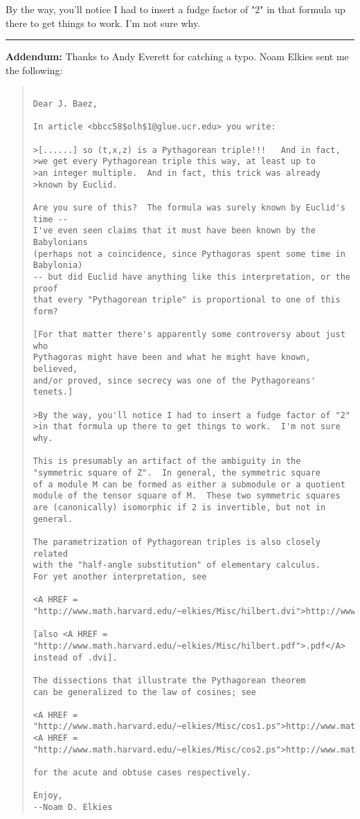By the way, you'll notice I had to insert a fudge factor of
"2" in that formula up there to get things to work.  I'm not
sure why.

\par\noindent\rule{\textwidth}{0.4pt}
\textbf{Addendum:} Thanks to Andy Everett for catching a typo.
Noam Elkies sent me the following:

\begin{quote}

\begin{verbatim}

Dear J. Baez,

In article <bbcc58$olh$1@glue.ucr.edu> you write:

>[......] so (t,x,z) is a Pythagorean triple!!!   And in fact,
>we get every Pythagorean triple this way, at least up to
>an integer multiple.  And in fact, this trick was already
>known by Euclid.

Are you sure of this?  The formula was surely known by Euclid's time --
I've even seen claims that it must have been known by the Babylonians
(perhaps not a coincidence, since Pythagoras spent some time in Babylonia)
-- but did Euclid have anything like this interpretation, or the proof
that every "Pythagorean triple" is proportional to one of this form?

[For that matter there's apparently some controversy about just who
Pythagoras might have been and what he might have known, believed,
and/or proved, since secrecy was one of the Pythagoreans' tenets.]

>By the way, you'll notice I had to insert a fudge factor of "2"
>in that formula up there to get things to work.  I'm not sure why.

This is presumably an artifact of the ambiguity in the
"symmetric square of Z".  In general, the symmetric square
of a module M can be formed as either a submodule or a quotient
module of the tensor square of M.  These two symmetric squares
are (canonically) isomorphic if 2 is invertible, but not in general.

The parametrization of Pythagorean triples is also closely related
with the "half-angle substitution" of elementary calculus.
For yet another interpretation, see

<A HREF = "http://www.math.harvard.edu/~elkies/Misc/hilbert.dvi">http://www.math.harvard.edu/~elkies/Misc/hilbert.dvi</A>

[also <A HREF = "http://www.math.harvard.edu/~elkies/Misc/hilbert.pdf">.pdf</A> instead of .dvi].

The dissections that illustrate the Pythagorean theorem
can be generalized to the law of cosines; see

<A HREF = "http://www.math.harvard.edu/~elkies/Misc/cos1.ps">http://www.math.harvard.edu/~elkies/Misc/cos1.ps</A>
<A HREF = "http://www.math.harvard.edu/~elkies/Misc/cos2.ps">http://www.math.harvard.edu/~elkies/Misc/cos2.ps</A>

for the acute and obtuse cases respectively.

Enjoy,
--Noam D. Elkies

\end{verbatim}
    
\end{quote}
